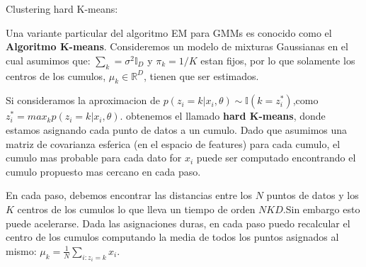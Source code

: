 \documentclass[ignorenonframetext,]{beamer}
\begin{document}
\begin{frame}

\begin{block}{Clustering hard K-means:}

Una variante particular del algoritmo EM para GMMs es conocido como el
\textbf{Algoritmo K-means}. Consideremos un modelo de mixturas
Gaussianas en el cual asumimos que:
\(\sum_{k} =\sigma^{2} \mathbb{I}_{D}\) y \(\pi_{k} = 1/K\) estan fijos,
por lo que solamente los centros de los cumulos,
\(\mu_{k} \in \mathbb{R}^{D}\), tienen que ser estimados.

Si consideramos la aproximacion de
\(p(z_{i}=k|x_{i}, \theta) \sim \mathbb{I}(k=z_{i}^{*})\),como
\(z_{i}^{*}= max_{k} p(z_{i}=k | x_{i}, \theta)\). obtenemos el llamado
\textbf{hard K-means}, donde estamos asignando cada punto de datos a un
cumulo. Dado que asumimos una matriz de covarianza esferica (en el
espacio de features) para cada cumulo, el cumulo mas probable para cada
dato for \(x_{i}\) puede ser computado encontrando el cumulo propuesto
mas cercano en cada paso.

En cada paso, debemos encontrar las distancias entre los \(N\) puntos de
datos y los \(K\) centros de los cumulos lo que lleva un tiempo de orden
\(NKD\).Sin embargo esto puede acelerarse. Dada las asignaciones duras,
en cada paso puedo recalcular el centro de los cumulos computando la
media de todos los puntos asignados al mismo:
\(\mu_{k}=\frac{1}{N} \sum_{i:z_{i}=k} x_{i}\).

\end{block}

\end{frame}
\end{document}
